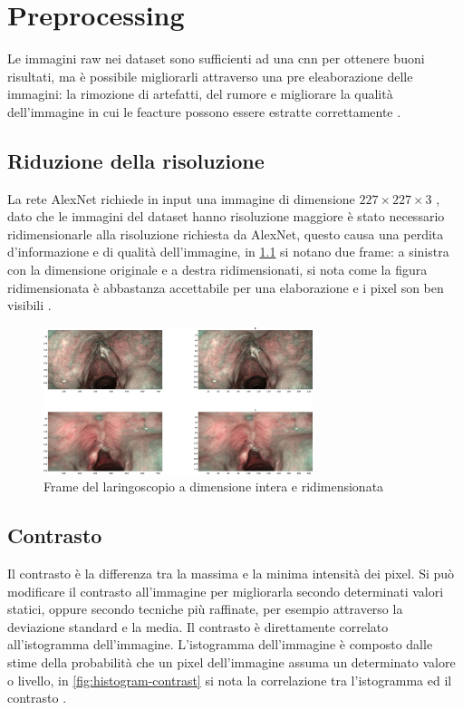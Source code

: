\chapter{Preprocessing}\label{preprocessing}

Le immagini raw nei dataset sono sufficienti ad una \gls{cnn} per ottenere buoni risultati, ma è possibile migliorarli attraverso una pre eleaborazione delle immagini: la rimozione di artefatti,  del rumore e migliorare la qualità dell'immagine 
in cui le feacture  possono essere estratte correttamente \cite{permual_contrast}.

\section{Riduzione della risoluzione}\label{riduzione-della-risoluzione}

La rete AlexNet richiede in input una immagine di dimensione \(227 \times 227 \times 3\) \cite{alexnet}, dato che le immagini del dataset hanno risoluzione maggiore è stato necessario ridimensionarle alla risoluzione richiesta da AlexNet, questo causa una perdita d'informazione e di qualità dell'immagine, in \cref{fig:resize} si notano due frame: a sinistra con la dimensione originale e a destra ridimensionati, si nota come la figura ridimensionata è abbastanza accettabile per una elaborazione e i pixel son ben visibili \cite{gonzalez_dip}.

\begin{figure}[ht]
    \centering
    \includegraphics[width=0.7\textwidth]{preprocessing/resize.pdf}
    \caption{Frame del laringoscopio a dimensione intera e ridimensionata}
    \label{fig:resize}
\end{figure}

\section{Contrasto}\label{contrasto}

Il contrasto è la differenza tra la massima e la minima
intensità dei pixel. Si può modificare il contrasto all'immagine per migliorarla secondo determinati valori statici, oppure secondo tecniche più raffinate, per esempio attraverso la deviazione standard e la media. Il contrasto è direttamente correlato all'istogramma dell'immagine. L'istogramma dell'immagine è composto dalle stime della probabilità che un pixel dell'immagine assuma un determinato valore o livello, in \cref{fig:histogram-contrast} si nota la correlazione tra l'istogramma ed il contrasto \cite{permual_contrast}  \cite{hummel_histogram} \cite{pandey_contrast} \cite{gonzalez_dip}.

